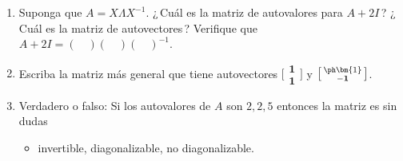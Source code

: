 \begin{enumerate}
\item Suponga que $A=X\Lambda X^{-1}$. ¿\,Cuál es la matriz de autovalores para $A+2I$\,? ¿\,Cuál es la matriz de autovectores\,? Verifique que  $A+2I=(\quad ) (\quad )(\quad )^{-1}$.


\item Escriba la matriz más general que tiene autovectores
  $\bigl[\begin{smallmatrix} \bm{1}\\
    \bm{1}\end{smallmatrix}\bigr]$ y $\bigl[\begin{smallmatrix}
    \ph \bm{1}\\ 
    \bold{-1}\end{smallmatrix}\bigr]$.

\item Verdadero o falso: Si los autovalores de $A$ son $2,2,5$ entonces la matriz es sin dudas
\begin{itemize}
\item[(a)] invertible,
\hitem[(b)] diagonalizable,
\hitem[(c)] no diagonalizable.
\end{itemize}


\end{enumerate}
